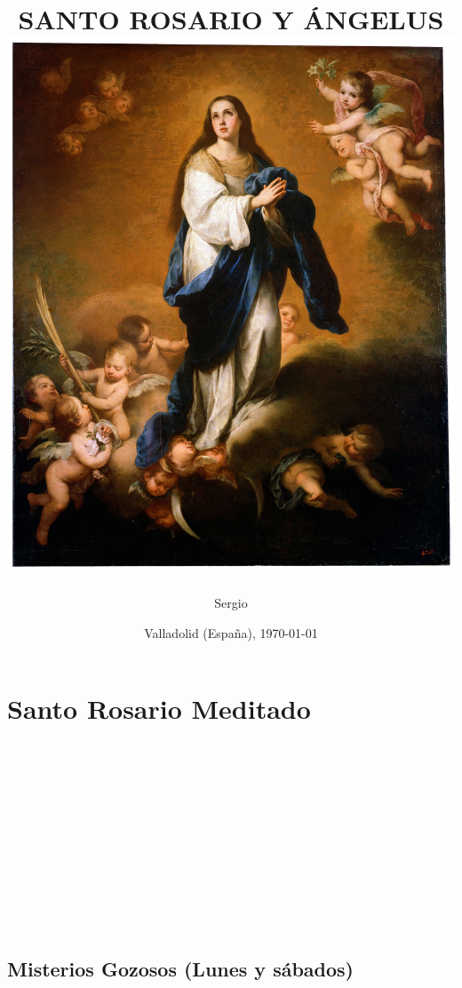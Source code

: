 \documentclass[10pt,a4paper,oneside]{book}
\title{
    {\Huge \uppercase{Santo Rosario y Ángelus}}\\
    {\includegraphics{foto-04.jpg}}\\
}
\author{Sergio}
\date{Valladolid (España), \monthyeardate\today}
\newcommand\blankpage{%
    \null
    \thispagestyle{empty}%
    \addtocounter{page}{-1}%
    \newpage
}
\begin{document}
\maketitle
\afterpage{\blankpage}

\chapter*{Santo Rosario Meditado}

\begin{minipage}[t]{0.475\textwidth}
      
      \vspace{1mm}
      \\[2mm]
      \\[1mm]
      \\[1mm]
      \\[1mm]
      \\
\end{minipage}
\begin{minipage}[t]{0.475\textwidth}
      
      \vspace{1mm}
      \\[2mm]
      \\[1mm]
      \\[1mm]
      \\[1mm]
      \\
\end{minipage}

\medskip

\begin{center}
\end{center}

\section*{Misterios Gozosos (Lunes y sábados)}
\end{document}
